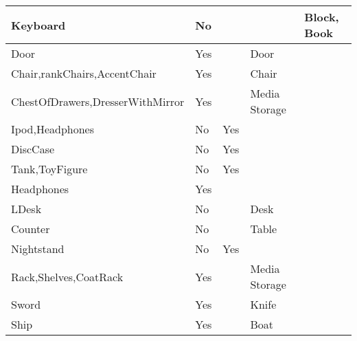 \documentclass{article}
\begin{document}
\begin{longtable}{|l|l|l|l|l|}
Keyboard                                 & No               &                                &                & Block, Book                 \\ \hline
Door                                     & Yes              &                                & Door           &                             \\ \hline
Chair,rankChairs,AccentChair             & Yes              &                                & Chair          &                             \\ \hline
ChestOfDrawers,DresserWithMirror         & Yes              &                                & Media Storage  &                             \\ \hline
Ipod,Headphones                          & No               & Yes                            &                &                             \\ \hline
DiscCase                                 & No               & Yes                            &                &                             \\ \hline
Tank,ToyFigure                           & No               & Yes                            &                &                             \\ \hline
Headphones                               & Yes              &                                &                &                             \\ \hline
LDesk                                    & No               &                                & Desk           &                             \\ \hline
Counter                                  & No               &                                & Table          &                             \\ \hline
Nightstand                               & No               & Yes                            &                &                             \\ \hline
Rack,Shelves,CoatRack                    & Yes              &                                & Media Storage  &                             \\ \hline
Sword                                    & Yes              &                                & Knife          &                             \\ \hline
Ship                                     & Yes              &                                & Boat           &                             \\ \hline

\end{longtable}
\end{document}
